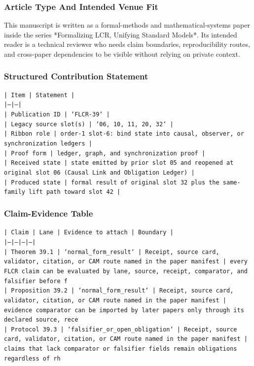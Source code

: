 \documentclass[11pt]{article}
\begin{document}
\subsubsection*{Article Type And Intended Venue Fit}

This manuscript is written as a formal-methods and mathematical-systems paper
inside the series *Formalizing LCR, Unifying Standard Models*. Its intended
reader is a technical reviewer who needs claim boundaries, reproducibility
routes, and cross-paper dependencies to be visible without relying on private
context.

\subsubsection*{Structured Contribution Statement}

\noindent\texttt{| Item | Statement |}\\
\noindent\texttt{|---|---|}\\
\noindent\texttt{| Publication ID | `FLCR-39` |}\\
\noindent\texttt{| Legacy source slot(s) | `06, 10, 11, 20, 32` |}\\
\noindent\texttt{| Ribbon role | order-1 slot-6: bind state into causal, observer, or synchronization ledgers |}\\
\noindent\texttt{| Proof form | ledger, graph, and synchronization proof |}\\
\noindent\texttt{| Received state | state emitted by prior slot 05 and reopened at original slot 06 (Causal Link and Obligation Ledger) |}\\
\noindent\texttt{| Produced state | formal result of original slot 32 plus the same-family lift path toward slot 42 |}\\

\subsubsection*{Claim-Evidence Table}

\noindent\texttt{| Claim | Lane | Evidence to attach | Boundary |}\\
\noindent\texttt{|---|---|---|---|}\\
\noindent\texttt{| Theorem 39.1 | `normal\_form\_result` | Receipt, source card, validator, citation, or CAM route named in the paper manifest | every FLCR claim can be evaluated by lane, source, receipt, comparator, and falsifier before f}\\
\noindent\texttt{| Proposition 39.2 | `normal\_form\_result` | Receipt, source card, validator, citation, or CAM route named in the paper manifest | evidence comparator can be imported by later papers only through its declared source, rece}\\
\noindent\texttt{| Protocol 39.3 | `falsifier\_or\_open\_obligation` | Receipt, source card, validator, citation, or CAM route named in the paper manifest | claims that lack comparator or falsifier fields remain obligations regardless of rh}\\
\end{document}
